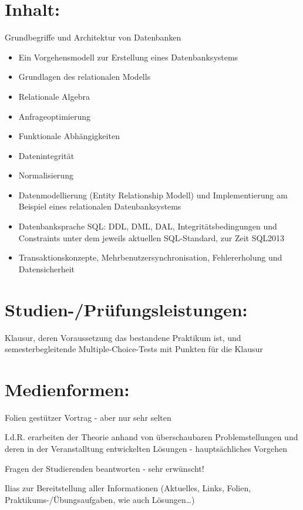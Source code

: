 \section{Inhalt:}\label{inhalt-7}

Grundbegriffe und Architektur von Datenbanken

\begin{itemize}
\item
  Ein Vorgehensmodell zur Erstellung eines Datenbanksystems
\item
  Grundlagen des relationalen Modells
\item
  Relationale Algebra
\item
  Anfrageoptimierung
\item
  Funktionale Abhängigkeiten
\item
  Datenintegrität
\item
  Normalisierung
\item
  Datenmodellierung (Entity Relationship Modell) und Implementierung am
  Beispiel eines relationalen Datenbanksystems
\item
  Datenbanksprache SQL: DDL, DML, DAL, Integritätsbedingungen und
  Constraints unter dem jeweils aktuellen SQL-Standard, zur Zeit SQL2013
\item
  Transaktionskonzepte, Mehrbenutzersynchronisation, Fehlererholung und
  Datensicherheit
\end{itemize}

\section{Studien-/Prüfungsleistungen:}\label{studien-pruxfcfungsleistungen-7}

Klausur, deren Voraussetzung das bestandene Praktikum ist, und
semesterbegleitende Multiple-Choice-Tests mit Punkten für die Klausur

\section{Medienformen:}\label{medienformen-7}

Folien gestützer Vortrag - aber nur sehr selten

I.d.R. erarbeiten der Theorie anhand von überschaubaren
Problemstellungen und deren in der Veranstalltung entwickelten Lösungen
- hauptsächliches Vorgehen

Fragen der Studierenden beantworten - sehr erwünscht!

Ilias zur Bereitstellung aller Informationen (Aktuelles, Links, Folien,
Praktikums-/Übungsaufgaben, wie auch Lösungen\ldots{})

